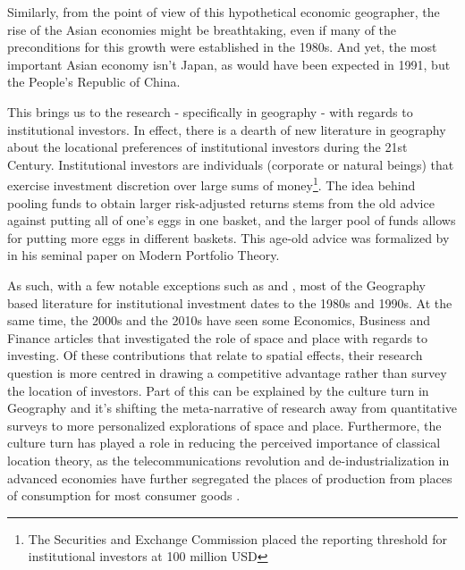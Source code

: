 Similarly, from the point of view of this hypothetical economic geographer, the rise of the Asian economies might be breathtaking, even if many of the preconditions for this growth were established in the 1980s.  And yet, the most important Asian economy isn't Japan, as would have been expected in 1991, but the People's Republic of China. 


This brings us to the research - specifically in geography - with regards to institutional investors. In effect, there is a dearth of new literature in geography about the locational preferences of institutional investors during the 21st Century. Institutional investors are individuals (corporate or natural beings) that exercise investment discretion over large sums of money\footnote{The Securities and Exchange Commission placed the reporting threshold for institutional investors at 100 million USD}\citep{SEC2013}.  The idea behind pooling funds to obtain larger risk-adjusted returns stems from the old advice against putting all of one's eggs in one basket, and the larger pool of funds allows for putting more eggs in different baskets.  This age-old advice was formalized by \cite{Markowitz1952} in his seminal paper on Modern Portfolio Theory.  


As such, with a few notable exceptions such as \cite{Graves2003,gongthe2012} and \cite{GreenOLef2014}, most of the Geography based literature for institutional investment dates to the 1980s and 1990s.  At the same time, the 2000s and the 2010s have seen some Economics, Business and Finance articles that investigated the role of space and place with regards to investing. Of these contributions that relate to spatial effects, their research question is more centred in drawing a competitive advantage rather than survey the location of investors.  Part of this can be explained by the culture turn in Geography and it's shifting the meta-narrative of research away from quantitative surveys to more personalized explorations of space and place.  Furthermore, the culture turn has played a role in reducing the perceived importance of classical location theory, as the telecommunications revolution and de-industrialization in advanced economies have further segregated the places of production from places of consumption for most consumer goods \citep{bryson1999economic}.    


